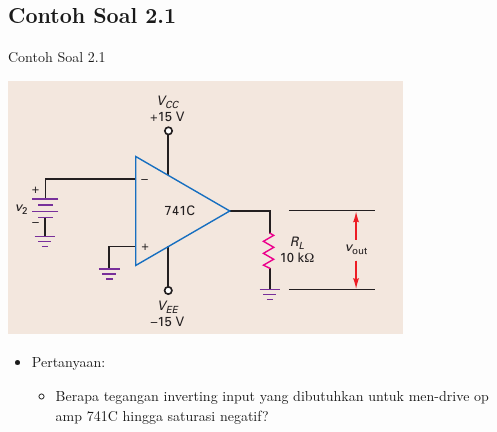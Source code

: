 \subsection{Contoh Soal 2.1}
\begin{frame}{Contoh Soal 2.1}
	\begin{multicols}{2}
		\begin{center}
			\includegraphics[width=\linewidth]{gambar/fig-16.11}
		\end{center}
		\columnbreak
		\begin{itemize}
			\item Pertanyaan:
			\begin{itemize}
				\item Berapa tegangan inverting input yang dibutuhkan untuk men-drive op amp 741C hingga saturasi negatif?
			\end{itemize}
		\end{itemize}
	\end{multicols}
\end{frame}